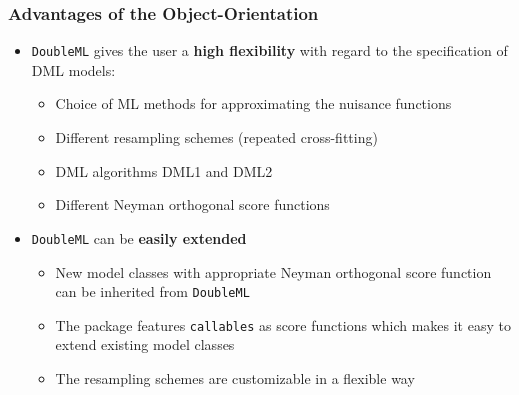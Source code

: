 \begin{frame}
\frametitle{Advantages of the Object-Orientation}
\begin{itemize}
\item \texttt{DoubleML} gives the user a \textbf{high flexibility} with regard to the specification of DML models:
\begin{itemize}
\item Choice of ML methods for approximating the nuisance functions
\item Different resampling schemes (repeated cross-fitting)
\item DML algorithms DML1 and DML2
\item Different Neyman orthogonal score functions
\end{itemize}
\item \texttt{DoubleML} can be \textbf{easily extended}
\begin{itemize}
\item New model classes with appropriate Neyman orthogonal score function can be inherited from \texttt{DoubleML}
\item The package features \texttt{callables} as score functions which makes it easy to extend existing model classes
\item The resampling schemes are customizable in a flexible way
\end{itemize}
\end{itemize}

\end{frame}


